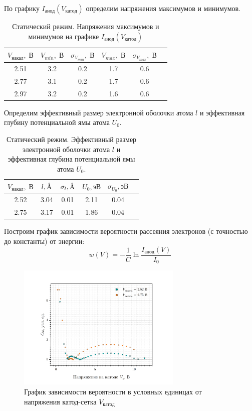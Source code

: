 \documentclass[a4paper, 12pt]{article}
\newcommand{\angstrom}{\text{\normalfont\AA}}
\newcommand{\V}{\; В}
\begin{document}
    По графику $I_{анод}(V_{катод})$ определим напряжения максимумов и минимумов.
	
    \begin{table}[H]
        \centering
        \begin{tabular}{c c c c c c }
            \toprule
            $V_{\text{накал}}, \V$ & $V_{min}, \V$ & $\sigma_{V_{min}}, \V$ & $V_{max}, \V$ & $\sigma_{V_{max}}, \V$ \\ \midrule
            2.51 & 3.2 & 0.2 & 1.7 & 0.6 \\
            2.77 & 3.1 & 0.2 & 1.7 & 0.6 \\
            2.97 & 3.2 & 0.2 & 1.6 & 0.6 \\ 
            \toprule
        \end{tabular}
        \caption{Статический режим. Напряжения максимумов и минимумов на графике $I_{анод}(V_{катод})$}
        \label{table:st}
    \end{table}

    Определим эффективный размер электронной оболочки атома $l$ и эффективная глубину потенциальной ямы атома $U_0$.
	
    \begin{table}[H]
        \centering
        \begin{tabular}{c c c c c c }
            \toprule
            $V_{\text{накал}}, \V$ & $l, \angstrom$ & $\sigma_l, \angstrom$ & $U_0, \text{эВ}$ & $\sigma_{U_0}, \text{эВ}$ \\ \midrule
            2.52 & 3.04 & 0.01 & 2.11 & 0.04 \\
            2.75 & 3.17 & 0.01 & 1.86 & 0.04 \\
            \toprule
        \end{tabular}
        \caption{Статический режим. Эффективный размер электронной оболочки атома $l$ и эффективная глубина потенциальной ямы атома $U_0$.}
        \label{table:atom-st}
    \end{table}

    Построим график зависимости вероятности рассеяния электронов (с точностью до константы) от энергии:
    $$
    w(V) = -\frac{1}{C} \ln{\frac{I_{анод}(V)}{I_0}}
    $$
    
    \begin{figure}[H]
        \centering
        \includegraphics[width = 0.7\textwidth]{images/graph_w(V).png}
        \caption{График зависимости вероятности в условных единицах от напряжения катод-сетка $V_{катод}$}
    \end{figure}
    
\end{document}
